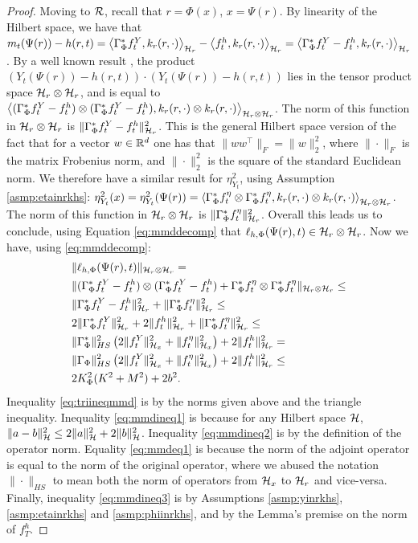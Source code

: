 \begin{proof}
Moving to $\mathcal{R}$, recall that $r=\Phi(x)$, $x = \Psi(r)$.
By linearity of the Hilbert space, we have that $m_t(\Psi(r)) - h(r,t) = \left<\Gamma_\Phi^* f^Y_t, k_r(r,\cdot)\right>_{\mathcal H_r} - \left<f^h_t,k_r(r,\cdot)\right>_{\mathcal H_r} = \left<\Gamma_\Phi^* f^Y_t - f^h_t,k_r(r,\cdot)\right>_{\mathcal H_r}$.
By a well known result \citep[Theorem 7.25]{steinwart2008support}, the product $(Y_t(\Psi(r)) - h(r,t) ) \cdot (Y_t(\Psi(r)) - h(r,t) )$ lies in the tensor product space  $\mathcal H_r \otimes \mathcal H_r$, and is equal to $\left< (\Gamma_\Phi^* f^Y_t - f^h_t) \otimes (\Gamma_\Phi^* f^Y_t - f^h_t) , k_r(r,\cdot) \otimes k_r(r,\cdot) \right>_{\mathcal H_r \otimes \mathcal H_r}$. The norm of this function in $\mathcal H_r \otimes \mathcal H_r$ is $\| \Gamma_\Phi^* f^Y_t - f^h_t \|^2_{\mathcal H_r}$. This is the general Hilbert space version of the fact that for a vector $w \in \mathbb{R}^d$ one has that $\|w w^\top\|_F = \|w\|_2^2$, where $\|\cdot\|_F$ is the matrix Frobenius norm, and $\| \cdot\|^2_2$ is the square of the standard Euclidean norm.
We therefore have a similar result for $\eta^2_{Y_t}$, using Assumption \ref{asmp:etainrkhs}: $\eta^2_{Y_t}(x) = \eta^2_{Y_t}(\Psi(r)) = \left<\Gamma_\Phi^* f^\eta_t \otimes \Gamma_\Phi^* f^\eta_t, k_r(r,\cdot) \otimes k_r(r,\cdot) \right>_{\mathcal H_r \otimes \mathcal H_r}$.  
The norm of this function in $\mathcal H_r \otimes \mathcal H_r$ is $\| \Gamma_\Phi^* f^\eta_t \|^2_{\mathcal H_r}$. 
Overall this leads us to conclude, using Equation \eqref{eq:mmddecomp} that $\ell_{h,\Phi}(\Psi(r),t) \in  \mathcal H_r \otimes \mathcal H_r$.
Now we have, using \eqref{eq:mmddecomp}:
\begin{align}
&\|\ell_{h,\Phi}(\Psi(r),t)\|_{\mathcal H_r \otimes \mathcal H_r} = \nonumber \\
&\|(\Gamma_\Phi^* f^Y_t - f^h_t) \otimes (\Gamma_\Phi^* f^Y_t - f^h_t)  + \Gamma_\Phi^* f^\eta_t \otimes \Gamma_\Phi^* f^\eta_t\|_{\mathcal H_r \otimes \mathcal H_r} \leq \label{eq:triineqmmd} \\
&\| \Gamma_\Phi^* f^Y_t - f^h_t \|^2_{\mathcal H_r} + \| \Gamma_\Phi^* f^\eta_t \|^2_{\mathcal H_r}  \label{eq:mmdineq1} \leq \\
&2 \|\Gamma_\Phi^* f^Y_t\|^2_{\mathcal H_r} + 2\|f^h_t \|^2_{\mathcal H_r}  + \| \Gamma_\Phi^* f^\eta_t \|^2_{\mathcal H_r} \label{eq:mmdineq2} \leq \\
&  \|\Gamma_\Phi^*\|^2_{HS} \left(2\|f^Y_t\|^2_{\mathcal H_x} + \|f^\eta_t\|^2 _{\mathcal H_x} \right)+ 2\|f^h_t \|^2_{\mathcal H_r} =  \label{eq:mmdeq1}\\
&  \|\Gamma_\Phi\|^2_{HS} \left(2\|f^Y_t\|^2_{\mathcal H_x} + \|f^\eta_t\|^2 _{\mathcal H_x} \right)+ 2\|f^h_t \|^2_{\mathcal H_r} \leq \label{eq:mmdineq3}\\
&2 K_\Phi^2 (K^2 + M^2) + 2 b^2. \nonumber
\end{align}
Inequality \eqref{eq:triineqmmd} is by the norms given above and the triangle inequality.
Inequality \eqref{eq:mmdineq1} is because for any Hilbert space $\mathcal H$, $\|a-b\|^2_\mathcal H \leq 2 \|a\|_\mathcal H^2 + 2 \|b\|_\mathcal H^2$. Inequality \eqref{eq:mmdineq2} is by the definition of the operator norm. Equality \eqref{eq:mmdeq1} is because the norm of the adjoint operator is equal to the norm of the original operator, where we abused the notation $\|\cdot \|_{HS}$ to mean both the norm of operators from $\mathcal H_x$ to $\mathcal H_r$ and vice-versa. Finally, inequality \eqref{eq:mmdineq3} is by Assumptions \ref{asmp:yinrkhs}, \ref{asmp:etainrkhs} and \ref{asmp:phiinrkhs}, and by the Lemma's premise on the norm of $f^h_T$.
\end{proof}

